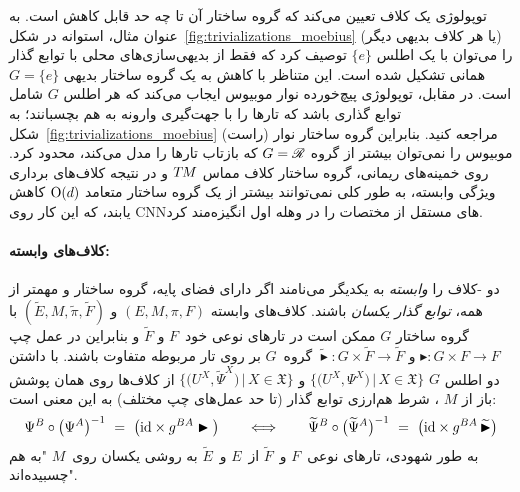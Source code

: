 توپولوژی یک کلاف تعیین می‌کند که گروه ساختار آن تا چه حد قابل کاهش است.
به عنوان مثال، استوانه در شکل~\ref{fig:trivializations_moebius} (یا هر کلاف بدیهی دیگر) را می‌توان با یک اطلس $\{e\}$ توصیف کرد که فقط از بدیهی‌سازی‌های محلی با توابع گذار همانی تشکیل شده است.
این متناظر با کاهش به یک گروه ساختار بدیهی $G=\{e\}$ است.
در مقابل، توپولوژی پیچ‌خورده نوار موبیوس ایجاب می‌کند که هر اطلس $G$ شامل توابع گذاری باشد که تارها را با جهت‌گیری وارونه به هم بچسبانند؛ به شکل~\ref{fig:trivializations_moebius} (راست) مراجعه کنید.
بنابراین گروه ساختار نوار موبیوس را نمی‌توان بیشتر از گروه $G=\mathscr{R}$ که بازتاب تارها را مدل می‌کند، محدود کرد.
روی خمینه‌های ریمانی، گروه ساختار کلاف مماس $T\mkern-1.5muM$ و در نتیجه کلاف‌های برداری ویژگی وابسته، به طور کلی نمی‌توانند بیشتر از یک گروه ساختار متعامد $\operatorname{O}(d)$ کاهش یابند، که این کار روی CNNهای مستقل از مختصات را در وهله اول انگیزه‌مند کرد.

\paragraph{کلاف‌های  وابسته:}
دو -کلاف را \emph{وابسته} به یکدیگر می‌نامند اگر دارای فضای پایه، گروه ساختار و مهمتر از همه، \emph{توابع گذار یکسان} باشند.
کلاف‌های وابسته $(E,M,\pi,F)$ و $(\widetilde{E},M,\widetilde{\pi},\widetilde{F})$ با گروه ساختار $G$ ممکن است در تارهای نوعی خود~$F$ و $\widetilde{F}$ و بنابراین در عمل چپ $\blacktriangleright: G \times F\to F$ و $\widetilde{\blacktriangleright}: G \times \widetilde{F}\to \widetilde{F}$ گروه~$G$ بر روی تار مربوطه متفاوت باشند.
با داشتن دو اطلس $G$
$\big\{\big( U^X,              \Psi^X  \big) \,\big|\, X\in\mathfrak{X} \big\}$ و
$\big\{\big( U^X, \widetilde{\Psi}^X \big) \,\big|\, X\in\mathfrak{X} \big\}$
از کلاف‌ها روی همان پوشش باز از $M$ ، شرط هم‌ارزی توابع گذار (تا حد عمل‌های چپ مختلف) به این معنی است:
\begin{align}
	\Psi^B \circ \big(\Psi^A \big)^{-1}\ =\ \big(\id \times g^{BA}\blacktriangleright \big)
	\qquad \Longleftrightarrow \qquad
	\widetilde{\Psi}^B \circ \big(\widetilde{\Psi}^A \big)^{-1}\ =\ \big(\id \times g^{BA}\, \widetilde{\blacktriangleright} \big)
\end{align}
به طور شهودی، تارهای نوعی~$F$ و~$\widetilde{F}$ از~$E$ و~$\widetilde{E}$ به روشی یکسان روی~$M$ "به هم چسبیده‌اند".


